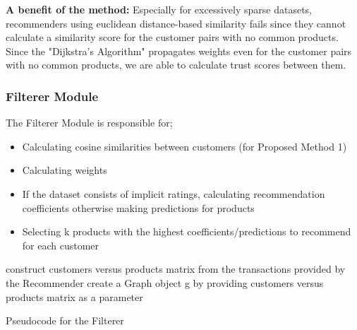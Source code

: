 	\textbf{A benefit of the method:} Especially for excessively sparse datasets, recommenders using euclidean distance-based similarity fails since they cannot calculate a similarity score for the customer pairs with no common products.	Since the  "Dijkstra's Algorithm" propagates weights even for the customer pairs with no common products, we are able to calculate trust scores between them.
	
	\subsubsection{Filterer Module} The Filterer Module is responsible for;
	\begin{itemize}
	\item Calculating cosine similarities between customers (for Proposed Method 1)
	\item Calculating weights
	\item If the dataset consists of implicit ratings, calculating recommendation coefficients otherwise making predictions for products
	\item Selecting k products with the highest coefficients/predictions to recommend for each customer
	\end{itemize}

	{
	\center
	\begin{algorithm}[H]
		\NoCaptionOfAlgo
		\SetAlgoLined
			construct customers versus products matrix from the transactions provided by the Recommender\;
			create a Graph object g by providing customers versus products matrix as a parameter\;
		\caption{Pseudocode for the Filterer}
	\end{algorithm}
}

